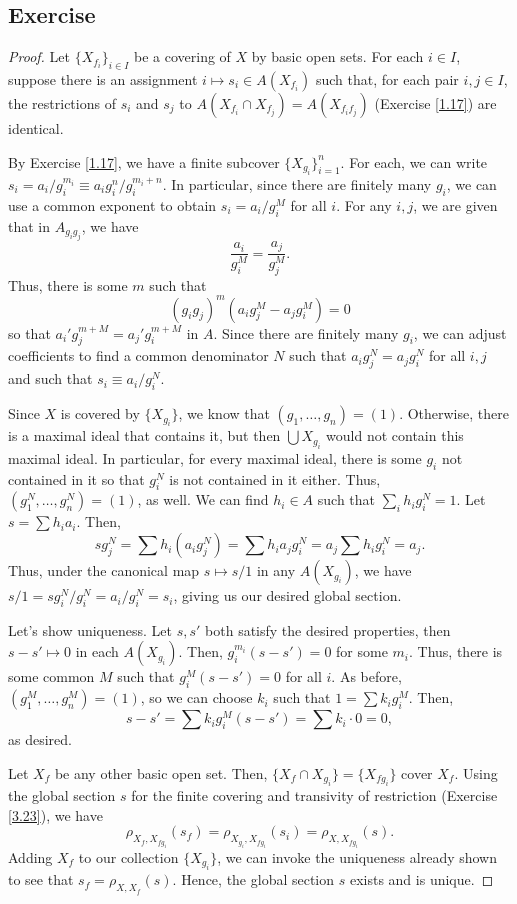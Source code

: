 \subsection{Exercise}\label{3.24}

\begin{proof}
Let $\{X_{f_i}\}_{i \in I}$ be a covering of $X$ by basic open sets. For each $i \in I$, suppose there is an assignment $i \mapsto s_i \in A(X_{f_i})$ such that, for each
pair $i,j \in I$, the restrictions of $s_i$ and $s_j$ to $A(X_{f_i} \cap X_{f_j}) = A(X_{f_if_j})$ (Exercise \ref{1.17}) are identical.

By Exercise \ref{1.17}, we have a finite subcover $\{X_{g_i}\}_{i=1}^n$. For each, we can write $s_i = a_i/g_i^{m_i} \equiv a_i g_i^n/g_i^{m_i + n}$. In particular, since there are finitely many $g_i$, 
we can use a common exponent to obtain $s_i = a_i / g_i^M$ for all $i$. For any $i,j$, we are given that in $A_{g_i g_j}$, we have
$$\frac{a_i}{g_i^M} = \frac{a_j}{g_j^M}.$$
Thus, there is some $m$ such that
$$(g_i g_j)^m(a_i g_j^M - a_j g_i^M) = 0$$
so that $a_i' g_j^{m+M} = a_j' g_i^{m+M}$ in $A$. Since there are finitely many $g_i$, we can adjust coefficients to find a common denominator $N$ such that
$a_i g_j^N = a_j g_i^N$ for all $i,j$ and such that $s_i \equiv a_i/g_i^N$.

Since $X$ is covered by $\{X_{g_i}\}$, we know that $(g_1,\ldots,g_n) = (1)$. Otherwise, there is a maximal ideal that contains it, but then $\bigcup X_{g_i}$ would
not contain this maximal ideal. In particular, for every maximal ideal, there is some $g_i$ not contained in it so that $g_i^N$ is not contained in it either. Thus,
$(g_1^N,\ldots,g_n^N) = (1)$, as well. We can find $h_i \in A$ such that $\sum_i h_i g_i^N = 1$. Let $s = \sum h_i a_i$. Then,
$$s g_j^N = \sum h_i (a_i g_j^N) = \sum h_i a_j g_i^N = a_j \sum h_i g_i^N = a_j.$$
Thus, under the canonical map $s \mapsto s/1$ in any $A(X_{g_i})$, we have $s/1 = s g_i^N / g_i^N = a_i / g_i^N = s_i$, giving us our desired global section.

Let's show uniqueness. Let $s,s'$ both satisfy the desired properties, then $s - s' \mapsto 0$ in each $A(X_{g_i})$. Then, $g_i^{m_i}(s - s') = 0$ for some $m_i$.
Thus, there is some common $M$ such that $g_i^M(s - s') = 0$ for all $i$. As before, $(g_1^M,\ldots,g_n^M) = (1)$, so we can choose $k_i$ such that $1 = \sum k_i g_i^M$. Then,
$$s - s' = \sum k_i g_i^M(s-s') = \sum k_i \cdot 0 = 0,$$
as desired.

Let $X_f$ be any other basic open set. Then, $\{X_f \cap X_{g_i}\} = \{X_{fg_i}\}$ cover $X_f$. Using the global section $s$ for the finite covering and transivity of 
restriction (Exercise \ref{3.23}), we have 
$$\rho_{X_f,X_{fg_i}}(s_f) = \rho_{X_{g_i}, X_{fg_i}}(s_i) = \rho_{X,X_{fg_i}}(s).$$
Adding $X_f$ to our collection $\{X_{g_i}\}$, we can invoke the uniqueness already shown to see that $s_f = \rho_{X,X_f}(s)$. Hence, the global section $s$ exists and is unique.
\end{proof}

